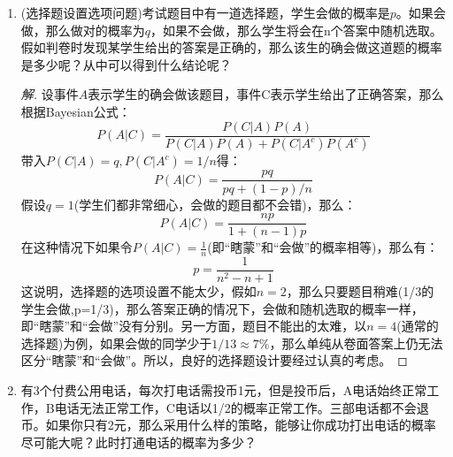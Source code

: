 \documentclass[12pt]{article}
\newcommand{\hei}{\CJKfamily{hei}}                          %
\begin{document}
\begin{enumerate}
\item {\hei (选择题设置选项问题)考试题目中有一道选择题，学生会做的概率是$p$。如果会做，那么做对的概率为$q$，如果不会做，那么学生将会在n个答案中随机选取。假如判卷时发现某学生给出的答案是正确的，那么该生的确会做这道题的概率是多少呢？从中可以得到什么结论呢？}
\begin{proof}[解]
	设事件$A$表示学生的确会做该题目，事件C表示学生给出了正确答案，那么根据Bayesian公式：
	\begin{equation}
	P(A|C)=\frac{P(C|A)P(A)}{P(C|A)P(A)+P(C|A^c)P(A^c)}
	\end{equation}
	带入$P(C|A)=q,P(C|A^c)=1/n$得：
	\begin{equation}
	P(A|C)=\frac{pq}{pq+(1-p)/n}
	\end{equation}
	假设$q=1$(学生们都非常细心，会做的题目都不会错)，那么：
	\begin{equation}
	P(A|C)=\frac{np}{1+(n-1)p}
	\end{equation}
	在这种情况下如果令$P(A|C)=\frac{1}{n}$(即“瞎蒙”和“会做”的概率相等)，那么有：
	\begin{equation}
	p=\frac{1}{n^2-n+1}
	\end{equation}
	这说明，选择题的选项设置不能太少，假如$n=2$，那么只要题目稍难(1/3的学生会做,p=1/3)，那么答案正确的情况下，会做和随机选取的概率一样，即“瞎蒙”和“会做”没有分别。另一方面，题目不能出的太难，以$n=4$(通常的选择题)为例，如果会做的同学少于$1/13\approx 7\%$，那么单纯从卷面答案上仍无法区分“瞎蒙”和“会做”。所以，良好的选择题设计要经过认真的考虑。
\end{proof}

\item {\hei 有3个付费公用电话，每次打电话需投币1元，但是投币后，A电话始终正常工作，B电话无法正常工作，C电话以1/2的概率正常工作。三部电话都不会退币。如果你只有2元，那么采用什么样的策略，能够让你成功打出电话的概率尽可能大呢？此时打通电话的概率为多少？}


\end{enumerate}
\end{document}
